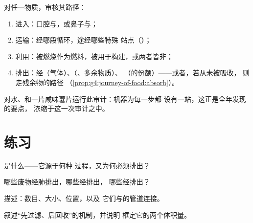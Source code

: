 \begin{method}[全身审计]\label{met:g7:removing-wastes:audit}
对任一物质，审核其路径：
\begin{enumerate}
  \item 进入：口腔与，或鼻子与；
  \item 运输：经哪段循环，途经哪些特殊
        站点（）；
  \item 利用：被燃烧作为燃料，被用于构建，或两者皆非；
  \item 排出：经（气体）、（、多余物质）、
        （的份额）——或者，若从未被吸收，
        则走残余物的路径
        （\cref{prop:g4:journey-of-food:absorb}）。
\end{enumerate}
对水、和一片咸味薯片运行此审计：机器为每一步都
设有一站，这正是全年发现的要点，
浓缩于这一次审计之中。
\end{method}

\section{练习}

\begin{exercise}[$\star$]\label{exo:g7:removing-wastes:1}
是什么——它源于何种
过程，又为何必须排出？
\end{exercise}

\begin{exercise}[$\star$]\label{exo:g7:removing-wastes:2}
哪些废物经肺排出，哪些经排出，
哪些经排出？
\end{exercise}

\begin{exercise}[$\star$]\label{exo:g7:removing-wastes:3}
描述：数目、大小、位置，以及
它们与的管道连接。
\end{exercise}

\begin{exercise}[$\star$]\label{exo:g7:removing-wastes:4}
叙述“先过滤、后回收”的机制，并说明
框定它的两个体积量。
\end{exercise}


